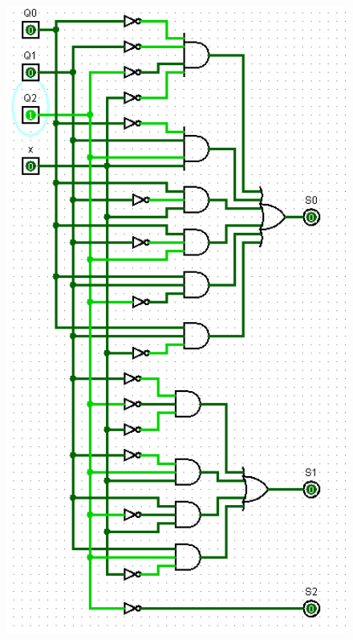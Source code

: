 \documentclass[]{article}
\begin{document}
\begin{minipage}{0.5\textwidth}
\begin{figure}[H]
	\centering
	\includegraphics[width=1\textwidth]{test0_1.png}
\end{figure}
\end{minipage}
\end{document}
